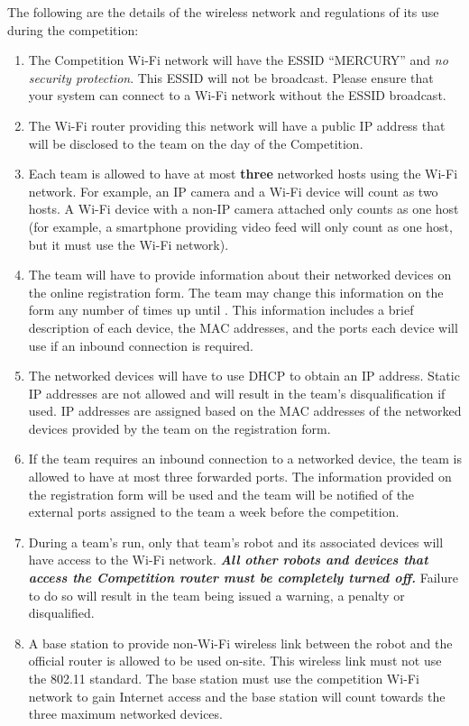 The following are the details of the wireless network and regulations of its use during the competition:

\begin{enumerate}
\item The Competition Wi-Fi network will have the ESSID “MERCURY” and \textit{no security protection}. This ESSID will not be broadcast. Please ensure that your system can connect to a Wi-Fi network without the ESSID broadcast.
\item The Wi-Fi router providing this network will have a public IP address that will be disclosed to the team on the day of the Competition.
\item Each team is allowed to have at most \textbf{three} networked hosts using the Wi-Fi network. For example, an IP camera and a Wi-Fi device will count as two hosts. A Wi-Fi device with a non-IP camera attached only counts as one host (for example, a smartphone providing video feed will only count as one host, but it must use the Wi-Fi network).
\item The team will have to provide information about their networked devices on the online registration form. The team may change this information on the form any number of times up until \textbf{\network}. This information includes a brief description of each device, the MAC addresses, and the ports each device will use if an inbound connection is required.
\item The networked devices will have to use DHCP to obtain an IP address. Static IP addresses are not allowed and will result in the team's disqualification if used. IP addresses are assigned based on the MAC addresses of the networked devices provided by the team on the registration form.
\item If the team requires an inbound connection to a networked device, the team is allowed to have at most three forwarded ports. The information provided on the registration form will be used and the team will be notified of the external ports assigned to the team a week before the competition.
\item During a team's run, only that team's robot and its associated devices will have access to the Wi-Fi network. \textbf{\textit{All other robots and devices that access the Competition router must be completely turned off.}} Failure to do so will result in the team being issued a warning, a penalty or disqualified.
\item A base station to provide non-Wi-Fi wireless link between the robot and the official router is allowed to be used on-site. This wireless link must not use the 802.11 standard. The base station must use the competition Wi-Fi network to gain Internet access and the base station will count towards the three maximum networked devices.

\end{enumerate}

